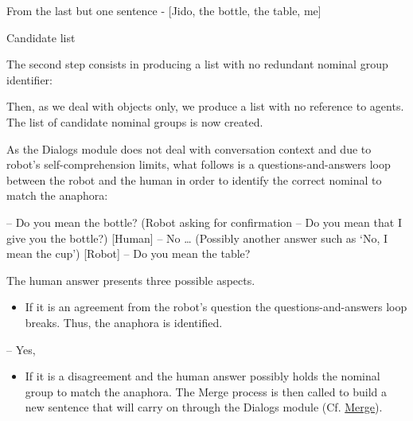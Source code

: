 \documentclass[twoside,a4paper,10pt]{report}
\begin{document}
\small
\begin{verbatimtab}
   From the last but one sentence - [Jido, the bottle, the table, me]
\end{verbatimtab}
\normalsize

Candidate list


\small
\begin{verbatimtab}
\end{verbatimtab}
\normalsize

The second step consists in producing a list with no redundant nominal group identifier:


\small
\begin{verbatimtab}
\end{verbatimtab}
\normalsize

Then, as we deal with objects only, we produce a list with no reference to agents. The list of candidate nominal groups is now created.


\small
\begin{verbatimtab}
\end{verbatimtab}
\normalsize

As the Dialogs module does not deal with conversation context and due to robot’s self-comprehension limits, what follows is a questions-and-answers loop between the robot and the human in order to identify the correct nominal to match the anaphora: 


\small
\begin{verbatimtab}
  [Robot] – Do you mean the bottle? (Robot asking for confirmation – Do you mean that I give you
the bottle?)
  [Human] – No … (Possibly another answer such as ‘No, I mean the cup’)
  [Robot] – Do you mean the table?
\end{verbatimtab}
\normalsize

The human answer presents three possible aspects.


\begin{itemize}
    \item  If it is an agreement from the robot’s question the questions-and-answers loop breaks. Thus, the anaphora is identified.
\end{itemize}

\small
\begin{verbatimtab}
  [Human] – Yes,
\end{verbatimtab}
\normalsize

\begin{itemize}
    \item  If it is a disagreement and the human answer possibly holds the nominal group to match the anaphora. The Merge process is then called to build a new sentence that will carry on through the Dialogs module (Cf. \hyperref[65464c31b2e6ac04da1fcaa37c9bd9c7]{Merge}).
\end{itemize}
\end{document}
